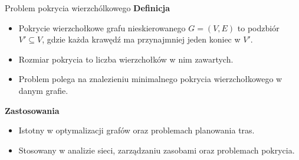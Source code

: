 \begin{frame}{Problem pokrycia wierzchólkowego}
\textbf{Definicja}
\begin{itemize}
	\item Pokrycie wierzchołkowe grafu nieskierowanego	$G = (V, E)$ to podzbiór $V'\subseteq V$, gdzie każda krawędź ma przynajmniej jeden koniec w $V'$.
	\item Rozmiar pokrycia to liczba wierzchołków w nim zawartych.
	\item Problem polega na znalezieniu minimalnego pokrycia wierzchołkowego w danym grafie.
\end{itemize}
\vspace{10pt}

\textbf{Zastosowania}
\begin{itemize}
	\item Istotny w optymalizacji grafów oraz problemach planowania tras.
	\item Stosowany w analizie sieci, zarządzaniu zasobami oraz problemach pokrycia.
\end{itemize}
\end{frame}